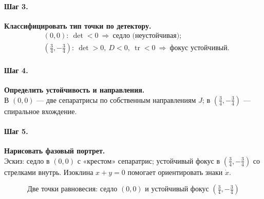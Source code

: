 \paragraph{Шаг 3.} \textbf{Классифицировать тип точки по детектору.}\\
\[
\begin{aligned}
&(0,0):\ \det<0\ \Rightarrow\ \text{седло (неустойчивая)};\\
&(\tfrac{3}{4},-\tfrac{3}{4}):\ \det>0,\ D<0,\ \operatorname{tr}<0\ \Rightarrow\ \text{фокус устойчивый}.
\end{aligned}
\]

\paragraph{Шаг 4.} \textbf{Определить устойчивость и направления.}\\
В \((0,0)\) — две сепаратрисы по собственным направлениям \(J\); в \((\tfrac{3}{4},-\tfrac{3}{4})\) — спиральное вхождение.

\paragraph{Шаг 5.} \textbf{Нарисовать фазовый портрет.}\\
Эскиз: седло в \((0,0)\) с «крестом» сепаратрис; устойчивый фокус в \((\tfrac{3}{4},-\tfrac{3}{4})\) со стрелками внутрь. Изоклина \(x+y=0\) помогает ориентировать знаки \(\dot x\).

\[
\boxed{\,\text{Две точки равновесия: седло }(0,0)\text{ и устойчивый фокус }(\tfrac{3}{4},-\tfrac{3}{4})\,}
\]

